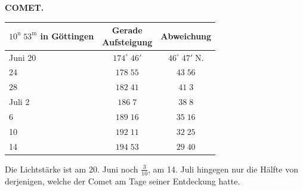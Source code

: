 \clearpage
\endgroup
\begingroup
\pagestyle{empty}
\newcommand{\GaussVICitation}[2]{%
  \begin{center}
  \parbox{#1\linewidth}{%
    \centering\footnotesize\frenchspacing
    \hrule height .3pt\relax\vspace{2.5pt}
    #2\par
    \vspace{2.5pt}\hrule height .3pt\relax
  }%
  \end{center}
  \par\nobreak\medskip
}
\newcommand{\GaussVIGathering}[2]{%
  \fancypagestyle{gaussVIGathering}{%
    \fancyhf{}%
    \renewcommand{\headrulewidth}{0pt}%
    \renewcommand{\footrulewidth}{0pt}%
    \fancyfoot[C]{\makebox[\textwidth][l]{%
      \hspace*{.025\textwidth}{\footnotesize\bfseries #1}\hfill
      {\normalsize\bfseries\textls[90]{#2}}\hspace*{.18\textwidth}}}%
  }%
  \thispagestyle{gaussVIGathering}%
}
\thispagestyle{empty}
\noindent{}%
\makebox[12mm][l]{}%
\parbox[t]{\dimexpr\linewidth-24mm\relax}{\centering\footnotesize\bfseries COMET.\par}%
\par\nobreak\medskip
\begin{center}\fontsize{10}{12}\selectfont\setlength{\tabcolsep}{5pt}\renewcommand{\arraystretch}{1.15}\begin{tabular}{l|c|c}
\shortstack{$10^{\mathrm u}\;53^{\mathrm m}$\\in Göttingen} & \shortstack{Gerade\\Aufsteigung} & Abweichung\\\hline
Juni 20 & $174^\circ\;46'$ & $46^\circ\;47'\;\mathrm{N.}$\\
24 & $178\;55$ & $43\;56$\\
28 & $182\;41$ & $41\;3$\\
Juli 2 & $186\;7$ & $38\;8$\\
6 & $189\;16$ & $35\;16$\\
10 & $192\;11$ & $32\;25$\\
14 & $194\;53$ & $29\;40$\\
\end{tabular}\end{center}

\par\indent Die Lichtstärke ist am 20. Juni noch $\frac{3}{10}$, am 14. Juli hingegen nur die Hälfte von
derjenigen, welche der Comet am Tage seiner Entdeckung hatte.

